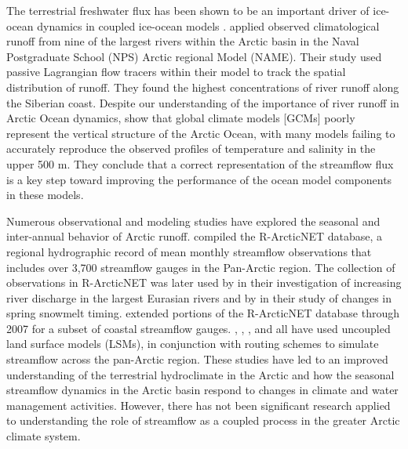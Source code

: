 \documentclass[jgrga, draft]{agutex}
\begin{document}
\begin{article}
The terrestrial freshwater flux has been shown to be an important driver of ice-ocean dynamics in coupled ice-ocean models \citep[e.g.][]{Morison_2012,Lique_2015}.
\citet{Newton_2008} applied observed climatological runoff from nine of the largest rivers within the Arctic basin in the Naval Postgraduate School (NPS) Arctic regional Model (NAME).
Their study used passive Lagrangian flow tracers within their model to track the spatial distribution of runoff.
They found the highest concentrations of river runoff along the Siberian coast.
Despite our understanding of the importance of river runoff in Arctic Ocean dynamics, \citet{Nummelin_2015} show that global climate models [GCMs] poorly represent the vertical structure of the Arctic Ocean, with many models failing to accurately reproduce the observed profiles of temperature and salinity in the upper 500 m.
They conclude that a correct representation of the streamflow flux is a key step toward improving the performance of the ocean model components in these models.

Numerous observational and modeling studies have explored the seasonal and inter-annual behavior of Arctic runoff.
\citet{Lammers_2001} compiled the R-ArcticNET database, a regional hydrographic record of mean monthly streamflow observations that includes over 3,700 streamflow gauges in the Pan-Arctic region.
The collection of observations in R-ArcticNET was later used by \citet{Shiklomanov_2009} in their investigation of increasing river discharge in the largest Eurasian rivers and by \citet{Tan_2011} in their study of changes in spring snowmelt timing.
\citet{Dai_2009} extended portions of the R-ArcticNET database through 2007 for a subset of coastal streamflow gauges.
\citet{Adam_2007}, \citet{Adam_2008}, \citet{Su_2005}, and \citet{Dai_2009} all have used uncoupled land surface models (LSMs), in conjunction with routing schemes to simulate streamflow across the pan-Arctic region.
These studies have led to an improved understanding of the terrestrial hydroclimate in the Arctic and how the seasonal streamflow dynamics in the Arctic basin respond to changes in climate and water management activities.
However, there has not been significant research applied to understanding the role of streamflow as a coupled process in the greater Arctic climate system.


\end{article}
\end{document}

